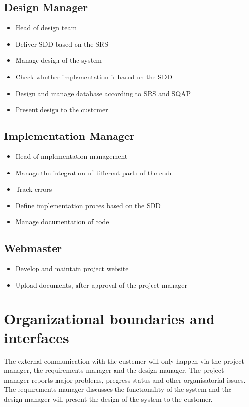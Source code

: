\documentclass[a4paper, 12pt]{report}
\begin{document}
		\subsection{Design Manager}	
			\begin{itemize}
				\item Head of design team
				\item Deliver SDD based on the SRS
				\item Manage design of the system
				\item Check whether implementation is based on the SDD
				\item Design and manage database according to SRS and SQAP
				\item Present design to the customer
			\end{itemize}	
			
		\subsection{Implementation Manager}
			\begin{itemize}
				\item Head of implementation management
				\item Manage the integration of different parts of the code
				\item Track errors
				\item Define implementation proces based on the SDD	
				\item Manage documentation of code
			\end{itemize}
			
		\subsection{Webmaster}
			\begin{itemize}
				\item Develop and maintain project website
				\item Upload documents, after approval of the project manager
			\end{itemize}	
		
		\section{Organizational boundaries and interfaces}
		
		The external communication with the customer will only happen via the project
		manager, the requirements manager and the design manager. The project manager reports
		major problems, progress status and other organisatorial issues. 
		The requirements manager discusses the functionality of the system and 
		the design manager will present the design of the system to the
		customer.  
		
\end{document}
